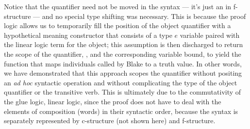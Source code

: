   Notice that the
  quantifier need not be moved in the syntax --- it's just an
   in f-structure --- and no special type shifting was
  necessary. This is because the proof logic allows
  us to temporarily fill the position of the object quantifier with a
  hypothetical meaning constructor that consists of a type $e$ variable
  paired with the linear logic term for the object; this assumption is
  then discharged to return the scope
  of the quantifier, , and the corresponding
  variable bound, to yield the function that maps individuals called
  by Blake to a truth value. In other words, we have demonstrated that
  this approach scopes the quantifier without positing an \emph{ad
    hoc} syntactic operation and without complicating the type of the
  object quantifier or the transitive verb. This is ultimately due to
  the commutativity of the glue logic, linear logic, since the proof
  does not have to deal with the elements of composition (words) in
  their syntactic order, because the syntax is separately represented by
  c-structure (not shown here) and f-structure. 

